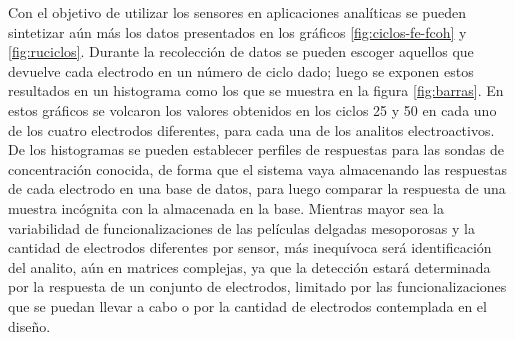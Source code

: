 {	Con el objetivo de utilizar los sensores en aplicaciones analíticas se pueden sintetizar aún más los datos presentados en los gráficos \ref{fig:ciclos-fe-fcoh} y \ref{fig:ruciclos}. Durante la recolección de datos se pueden escoger aquellos que devuelve cada electrodo en un número de ciclo dado; luego se exponen estos resultados en un histograma como los que se muestra en la figura \ref{fig:barras}. En estos gráficos se volcaron los valores obtenidos en los ciclos 25 y 50 en cada uno de los cuatro electrodos diferentes, para cada una de los analitos electroactivos. De los histogramas se pueden establecer perfiles de respuestas para las sondas de concentración conocida, de forma que el sistema vaya almacenando las respuestas de cada electrodo en una base de datos, para luego comparar la respuesta de una muestra incógnita con la almacenada en la base. Mientras mayor sea la variabilidad de funcionalizaciones de las películas delgadas mesoporosas y la cantidad de electrodos diferentes por sensor, más inequívoca será identificación del analito, aún en matrices complejas, ya que la detección estará determinada por la respuesta de un conjunto de electrodos, limitado por las funcionalizaciones que se puedan llevar a cabo o por la cantidad de electrodos contemplada en el diseño.
   		

}
